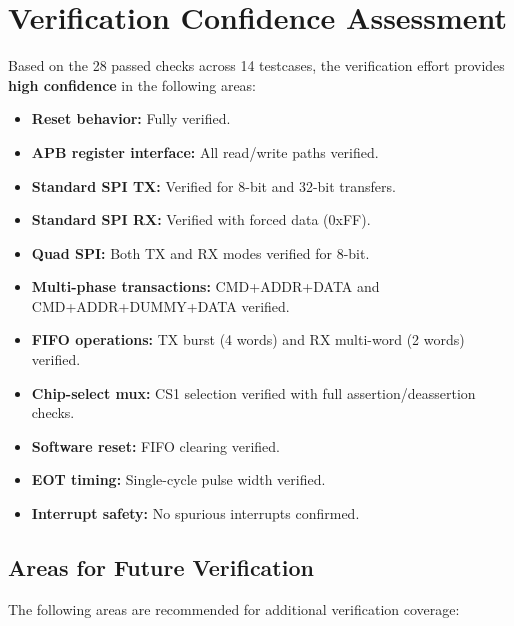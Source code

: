 \section{Verification Confidence Assessment}

Based on the 28 passed checks across 14 testcases, the verification effort provides
\textbf{high confidence} in the following areas:

\begin{itemize}[leftmargin=2em]
  \item \textbf{Reset behavior:} Fully verified.
  \item \textbf{APB register interface:} All read/write paths verified.
  \item \textbf{Standard SPI TX:} Verified for 8-bit and 32-bit transfers.
  \item \textbf{Standard SPI RX:} Verified with forced data (0xFF).
  \item \textbf{Quad SPI:} Both TX and RX modes verified for 8-bit.
  \item \textbf{Multi-phase transactions:} CMD+ADDR+DATA and CMD+ADDR+DUMMY+DATA verified.
  \item \textbf{FIFO operations:} TX burst (4 words) and RX multi-word (2 words) verified.
  \item \textbf{Chip-select mux:} CS1 selection verified with full assertion/deassertion checks.
  \item \textbf{Software reset:} FIFO clearing verified.
  \item \textbf{EOT timing:} Single-cycle pulse width verified.
  \item \textbf{Interrupt safety:} No spurious interrupts confirmed.
\end{itemize}

\subsection{Areas for Future Verification}

The following areas are recommended for additional verification coverage:

